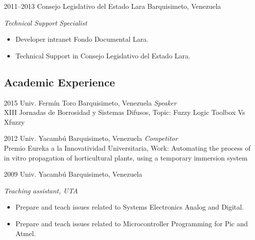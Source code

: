\documentclass[a4paper,nocolors]{cv-friggeri-x}
\begin{document}
\begin{entrylist}

\entry
{2011--2013}
{Consejo Legislativo del Estado Lara}
{Barquisimeto, Venezuela}
{\emph{Technical Support Specialist}
\begin{itemize}
\item Developer intranet Fondo Documental Lara.
\item Technical Support in Consejo Legislativo del Estado Lara.
\end{itemize}}

\end{entrylist}


\subsection{Academic Experience}

\begin{entrylist}

\entry
{2015}
{Univ. Fermín Toro}
{Barquisimeto, Venezuela}
{\emph{Speaker} \\
XIII Jornadas de Borrosidad y Sistemas Difusos, Topic: Fuzzy Logic Toolbox Vs Xfuzzy}


\end{entrylist}
\begin{entrylist}
\entry
{2012}
{Univ. Yacambú}
{Barquisimeto, Venezuela}
{\emph{Competitor} \\
Premio Eureka a la Innovatividad Universitaria, Work: Automating the process of in vitro propagation of horticultural plants, using a temporary immersion system}


\entry
{2009}
{Univ. Yacambú}
{Barquisimeto, Venezuela}
{\emph{Teaching assistant, UTA}
\begin{itemize}
\item Prepare and teach issues related to Systems Electronics Analog and Digital.
\item Prepare and teach issues related to Microcontroller Programming for Pic and Atmel.
\end{itemize}}
\end{entrylist}


\end{document}

